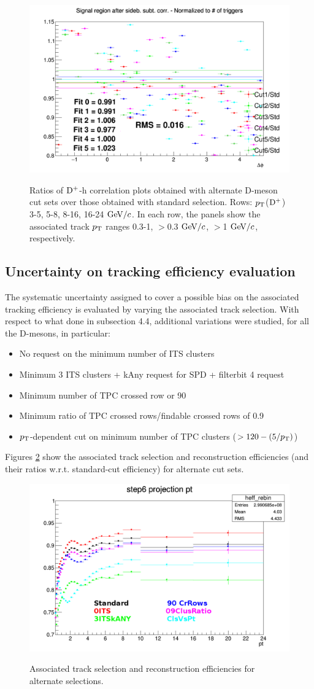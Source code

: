 \begin{figure}
{\includegraphics[width=0.31\linewidth]{figures/Systematics/Dplus/CutVar/Ratio_AzimCorrDistr_Dplus_Canvas_PtIntBins13to13_PoolInt_thr1dotto99dot.png}}
 \caption{Ratios of ${\rm D^+}$-h correlation plots obtained with alternate D-meson cut sets over those obtained with standard selection. Rows: $p_{\rm T}$(${\rm D^+}$) 3-5, 5-8, 8-16, 16-24 $\mathrm{GeV}/c$. In each row, the panels show the associated track $p_{\rm T}$ ranges 0.3-1, $>$0.3 $\mathrm{GeV}/c$,  $>$1 $\mathrm{GeV}/c$, respectively.}
\label{fig:Syst_DplusCutVar}
\end{figure}


\clearpage
\subsection{Uncertainty on tracking efficiency evaluation}
The systematic uncertainty assigned to cover a possible bias on the associated tracking efficiency is evaluated by varying the associated track selection.
With respect to what done in subsection 4.4, additional variations were studied, for all the D-mesons, in particular:
\begin{itemize}
  \item No request on the minimum number of ITS clusters
  \item Minimum 3 ITS clusters + kAny request for SPD + filterbit 4 request
  \item Minimum number of TPC crossed row or 90
  \item Minimum ratio of TPC crossed rows/findable crossed rows of 0.9
  \item $p_{\rm T}$-dependent cut on minimum number of TPC clusters ($> 120-(5/p_{\rm T})$)
\end{itemize}

Figures \ref{fig:TrEffVariations} show the associated track selection and reconstruction efficiencies (and their ratios w.r.t. standard-cut efficiency) for alternate cut sets.

\begin{figure}
\centering
{\includegraphics[width=0.75\linewidth]{figures/Systematics/Dzero/TrackCut/AltTrackEff.png}}
\caption{Associated track selection and reconstruction efficiencies for alternate selections.}
\label{fig:TrEffVariations}
\end{figure}

